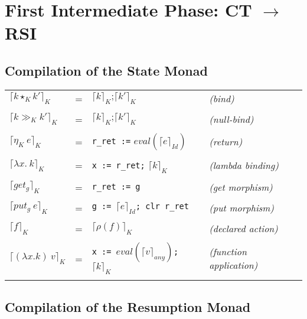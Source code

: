 \documentclass{article}
\newcommand{\compile}[2]{\lceil #2 \rceil_{#1}}
\newcommand{\nullbind}[0]{\gg}
\begin{document}
\section{First Intermediate Phase: CT $\rightarrow$ RSI}

\subsection{Compilation of the State Monad}

\begin{tabular}[t]{llll}

$\compile{K}{k \star_K k\prime}$ &=& $\compile{K}{k}\texttt{;} \compile{K}{k\prime}$ &\emph{(bind)}\\
\\
$\compile{K}{k \nullbind_K k\prime}$ &=& $\compile{K}{k}\texttt{;} \compile{K}{k\prime}$ &\emph{(null-bind)}\\
\\
$\compile{K}{\eta_K\ e}$ &=& \texttt{r\_ret :=} $eval(\compile{Id}{e})$&\emph{(return)}\\
\\
$\compile{K}{\lambda x.\ k}$ &=& \texttt{x := r\_ret;} $\compile{K}{k}$ &\emph{(lambda binding)}\\
\\
$\compile{K}{get_g}$ &=& \texttt{r\_ret := g} &\emph{(get morphism)}\\
\\
$\compile{K}{put_g\ e}$ &=& \texttt{g := $\compile{Id}{e}$; clr r\_ret} &\emph{(put morphism)}\\
\\
$\compile{K}{f}$ &=& $\compile{K}{\rho(f)}$ &\emph{(declared action)}\\
\\
$\compile{K}{(\lambda x.k)\ v}$ &=& \texttt{x := $eval(\compile{any}{v})$;} $\compile{K}{k}$ &\emph{(function application)}\\
\\

\end{tabular}

\subsection{Compilation of the Resumption Monad}
\end{document}

